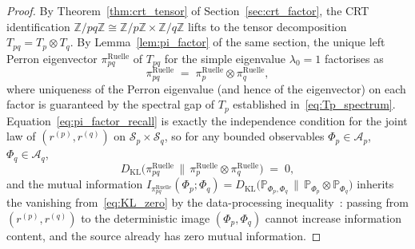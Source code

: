 \begin{proof}
By Theorem~\ref{thm:crt_tensor} of
Section~\ref{sec:crt_factor}, the CRT identification
$\mathbb{Z}/pq\mathbb{Z} \cong \mathbb{Z}/p\mathbb{Z} \times
\mathbb{Z}/q\mathbb{Z}$ lifts to the tensor decomposition
$T_{pq} = T_p \otimes T_q$. By Lemma~\ref{lem:pi_factor} of the same
section, the unique left Perron eigenvector
$\pi_{pq}^{\mathrm{Ruelle}}$ of $T_{pq}$ for the simple eigenvalue
$\lambda_0 = 1$ factorises as
\begin{equation}
  \pi_{pq}^{\mathrm{Ruelle}}
  \;=\; \pi_{p}^{\mathrm{Ruelle}} \otimes \pi_{q}^{\mathrm{Ruelle}},
  \label{eq:pi_factor_recall}
\end{equation}
where uniqueness of the Perron eigenvalue (and hence of the
eigenvector) on each factor is guaranteed by the spectral gap of
$T_p$ established in~\eqref{eq:Tp_spectrum}.
Equation~\eqref{eq:pi_factor_recall} is exactly the independence
condition for the joint law of $(r^{(p)}, r^{(q)})$ on
$\mathcal{S}_p \times \mathcal{S}_q$, so for any bounded
observables $\Phi_p \in \mathcal{A}_p$, $\Phi_q \in \mathcal{A}_q$,
\begin{equation}
  D_{\mathrm{KL}}\!\bigl(\pi_{pq}^{\mathrm{Ruelle}}
       \,\|\, \pi_{p}^{\mathrm{Ruelle}} \otimes \pi_{q}^{\mathrm{Ruelle}}\bigr)
  \;=\; 0,
  \label{eq:KL_zero}
\end{equation}
and the mutual information
$I_{\pi_{pq}^{\mathrm{Ruelle}}}(\Phi_p; \Phi_q) =
D_{\mathrm{KL}}\bigl(\mathbb{P}_{\Phi_p, \Phi_q} \,\|\,
\mathbb{P}_{\Phi_p} \otimes \mathbb{P}_{\Phi_q}\bigr)$ inherits the
vanishing from~\eqref{eq:KL_zero} by the data-processing
inequality~\cite[\S~2.8]{CoverThomas2006}: passing from
$(r^{(p)}, r^{(q)})$ to the deterministic image
$(\Phi_p, \Phi_q)$ cannot increase information content, and the
source already has zero mutual information.
\end{proof}

